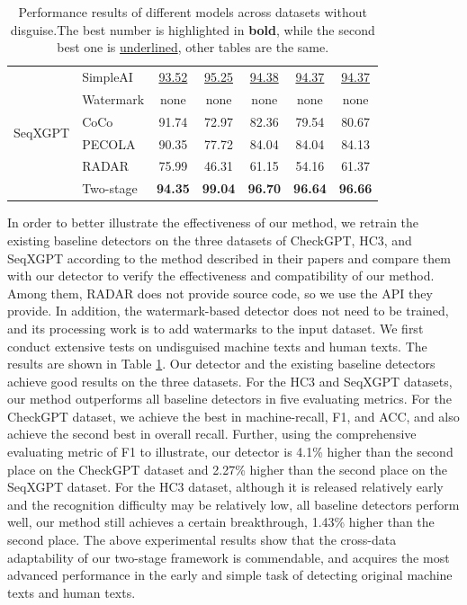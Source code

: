 \documentclass[11pt]{article}
\begin{document}
\begin{table}[ht]
{\begin{tabular}{llccccc}
    \multirow{6}{*}{SeqXGPT}
    & SimpleAI & \underline{93.52} & \underline{95.25} & \underline{94.38} & \underline{94.37} & \underline{94.37} \\
    & Watermark & none & none & none & none & none \\
    & CoCo & 91.74 & 72.97 & 82.36 & 79.54 & 80.67 \\
    & PECOLA & 90.35 & 77.72 & 84.04 & 84.04 & 84.13 \\
    & RADAR & 75.99 & 46.31 & 61.15 & 54.16 & 61.37 \\
    & Two-stage & \textbf{94.35} & \textbf{99.04} & \textbf{96.70} & \textbf{96.64} & \textbf{96.66} \\
		\bottomrule
		\end{tabular}
		}
		\caption{Performance results of different models across datasets without disguise.The best number is highlighted in \textbf{bold}, while the second best one is \underline{underlined}, other tables are the same.}
		\label{tab:combined_results}
		\end{table}

		In order to better illustrate the effectiveness of our method, we retrain the existing baseline detectors on the three datasets of CheckGPT, HC3, and SeqXGPT according to the method described in their papers and compare them with our detector to verify the effectiveness and compatibility of our method. Among them, RADAR does not provide source code, so we use the API they provide. In addition, the watermark-based detector does not need to be trained, and its processing work is to add watermarks to the input dataset. We first conduct extensive tests on undisguised machine texts and human texts. The results are shown in Table \ref{tab:combined_results}. Our detector and the existing baseline detectors achieve good results on the three datasets. For the HC3 and SeqXGPT datasets, our method outperforms all baseline detectors in five evaluating metrics. For the CheckGPT dataset, we achieve the best in machine-recall, F1, and ACC, and also achieve the second best in overall recall. Further, using the comprehensive evaluating metric of F1 to illustrate, our detector is 4.1\% higher than the second place on the CheckGPT dataset and 2.27\% higher than the second place on the SeqXGPT dataset. For the HC3 dataset, although it is released relatively early and the recognition difficulty may be relatively low, all baseline detectors perform well, our method still achieves a certain breakthrough, 1.43\% higher than the second place. The above experimental results show that the cross-data adaptability of our two-stage framework is commendable, and acquires the most advanced performance in the early and simple task of detecting original machine texts and human texts.
\end{document}
